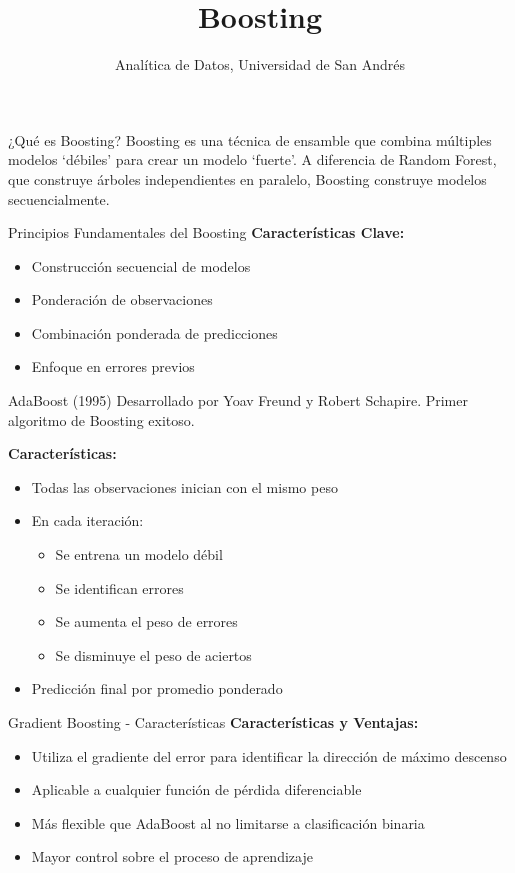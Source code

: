 \documentclass{beamer}
\title{\Huge\textbf{Boosting}}
\author{Analítica de Datos, Universidad de San Andrés}
\date{}
\begin{document}
\begin{frame}
    \titlepage
\end{frame}

\begin{frame}{¿Qué es Boosting?}
    Boosting es una técnica de ensamble que combina múltiples modelos `débiles' para crear un modelo `fuerte'. A diferencia de Random Forest, que construye árboles independientes en paralelo, Boosting construye modelos secuencialmente.
\end{frame}

\begin{frame}{Principios Fundamentales del Boosting}
    \textbf{Características Clave:}
    \begin{itemize}
        \item<2-> Construcción secuencial de modelos
        \item<3-> Ponderación de observaciones
        \item<4-> Combinación ponderada de predicciones
        \item<5-> Enfoque en errores previos
    \end{itemize}
\end{frame}

\begin{frame}{AdaBoost (1995)}
    Desarrollado por Yoav Freund y Robert Schapire. Primer algoritmo de Boosting exitoso.
    
    \textbf{Características:}
    \begin{itemize}
        \item<2-> Todas las observaciones inician con el mismo peso
        \item<3-> En cada iteración:
        \begin{itemize}
            \item<4-> Se entrena un modelo débil
            \item<5-> Se identifican errores
            \item<6-> Se aumenta el peso de errores
            \item<7-> Se disminuye el peso de aciertos
        \end{itemize}
        \item<8-> Predicción final por promedio ponderado
    \end{itemize}
\end{frame}

\begin{frame}{Gradient Boosting - Características}
    \textbf{Características y Ventajas:}
    \begin{itemize}
        \item<2-> Utiliza el gradiente del error para identificar la dirección de máximo descenso
        \item<3-> Aplicable a cualquier función de pérdida diferenciable
        \item<4-> Más flexible que AdaBoost al no limitarse a clasificación binaria
        \item<5-> Mayor control sobre el proceso de aprendizaje
    \end{itemize}
\end{frame}
\end{document}
